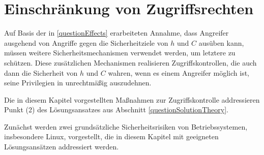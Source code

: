 \documentclass[../main.tex]{subfiles}
\begin{document}






  \section{Einschränkung von Zugriffsrechten}
		\label{secAccessControls}

		Auf Basis der in \ref{questionEffects} erarbeiteten Annahme, dass Angreifer ausgehend von \cbroken{} Angriffe gegen die Sicherheitziele von \(h\) und \(C\) ausüben kann, müssen weitere Sicherheitsmechanismen verwendet werden, um letztere zu schützen. Diese zusätzlichen Mechanismen realisieren Zugriffskontrollen, die auch dann die Sicherheit von \(h\) und \(C\) wahren, wenn es einem Angreifer möglich ist, seine Privilegien in \cbroken{} unrechtmäßig auszudehnen.

		Die in diesem Kapitel vorgestellten Maßnahmen zur Zugriffskontrolle addressieren Punkt (2) des Lösungsansatzes aus Abschnitt \ref{questionSolutionTheory}.

		Zunächst werden zwei grundsätzliche Sicherheitsrisiken von Betriebssystemen, insbesondere Linux, vorgestellt, die in diesem Kapitel mit geeigneten Lösungsansätzen addressiert werden.
\end{document}
